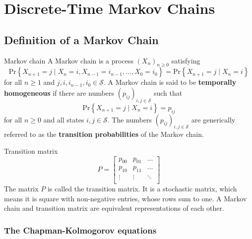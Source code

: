 \section{Discrete-Time Markov Chains}

\subsection{Definition of a Markov Chain}

\begin{defn}{Markov chain}{}
    A Markov chain is a process \( (X_{n} )_{n\geq 0} \) satisfying
    \[
        \mathrm{Pr} \left\{ X_{n + 1} = j \mid  X_{n} = i, X_{n - 1} = i_{n - 1} , \dots , X_0 = i_0 \right\} = \mathrm{Pr} \left\{ X_{n + 1} = j \mid X_{n} = i \right\}       
    \]
    for all \( n\geq 1 \) and \( j, i, i_{n - 1} , i_0 \in \mathcal{S}  \). A Markov chain is said to be \textbf{temporally homogeneous} if there are numbers \( (p_{ij} )_{i,j \in \mathcal{S} } \) such that
    \[
        \mathrm{Pr} \left\{ X_{n + 1} = j \mid X_{n} = i \right\} = p_{ij} 
    \]
    for all \( n\geq 0 \) and all states \( i,j \in \mathcal{S}  \). The numbers \( (p_{ij} )_{i,j \in \mathcal{S} } \) are generically referred to as the  \textbf{transition probabilities} of the Markov chain. 
\end{defn}

\begin{defn}{Transition matrix}{}
\[
    P = \begin{bmatrix}
        p_{00}  & p_{01}  & \dots   \\
         p_{10} &  p_{11} &   \dots \\
         \vdots& \vdots & \ddots  \\ 
    \end{bmatrix}
\] The matrix \( P \) is called the transition matrix. It is a stochastic matrix, which means it is square with non-negative entries, whose rows sum to one. A Markov chain and transition matrix are equivalent representations of each other.



\end{defn}
\subsubsection{The Chapman-Kolmogorov equations}

